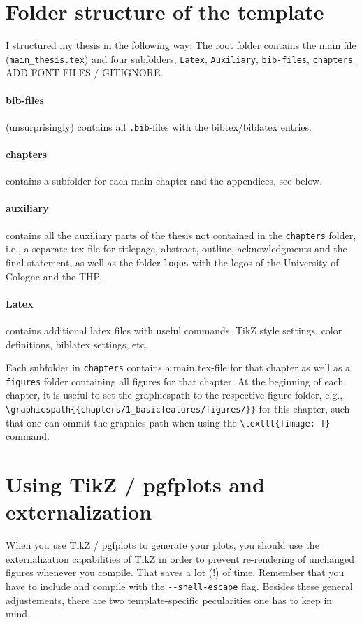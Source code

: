 \section{Folder structure of the template}
I structured my thesis in the following way: The root folder contains the main file (\verb|main_thesis.tex|) and four subfolders, \verb|Latex|, \verb|Auxiliary|, \verb|bib-files|, \verb|chapters|. ADD FONT FILES / GITIGNORE.
\paragraph{bib-files} (unsurprisingly) contains all \verb|.bib|-files with the bibtex/biblatex entries.
\paragraph{chapters} contains a subfolder for each main chapter and the appendices, see below.
\paragraph{auxiliary} contains all the auxiliary parts of the thesis not contained in the \verb|chapters| folder, i.e., a separate tex file for titlepage, abstract, outline, acknowledgments and the final statement, as well as the folder \verb|logos| with the logos of the University of Cologne and the THP.
\paragraph{Latex} contains additional latex files with useful commands, TikZ style settings, color definitions, biblatex settings, etc.

Each subfolder in \verb|chapters| contains a main tex-file for that chapter as well as a \verb|figures| folder containing all figures for that chapter.
At the beginning of each chapter, it is useful to set the graphicspath to the respective figure folder, e.g., \verb|\graphicspath{{chapters/1_basicfeatures/figures/}}| for this chapter, such that one can ommit the graphics path when using the \verb|\texttt{[image: ]}| command.


\section{Using TikZ / pgfplots and externalization}
When you use TikZ / pgfplots to generate your plots, you should use the externalization capabilities of TikZ in order to prevent re-rendering of unchanged figures whenever you compile. That saves a lot (!) of time. 
Remember that you have to include \verb|| and compile with the \verb|--shell-escape| flag. Besides these general adjustements, there are two template-specific pecularities one has to keep in mind. 

